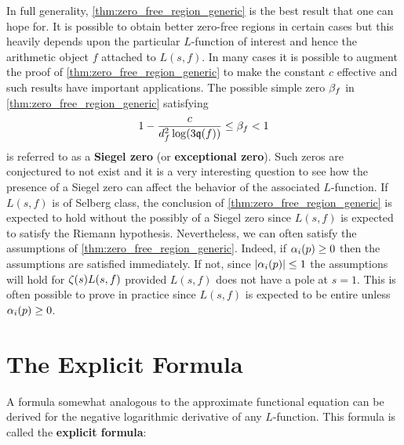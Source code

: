     In full generality, \cref{thm:zero_free_region_generic} is the best result that one can hope for. It is possible to obtain better zero-free regions in certain cases but this heavily depends upon the particular $L$-function of interest and hence the arithmetic object $f$ attached to $L(s,f)$. In many cases it is possible to augment the proof of \cref{thm:zero_free_region_generic} to make the constant $c$ effective and such results have important applications. The possible simple zero $\beta_{f}$ in \cref{thm:zero_free_region_generic} satisfying
    \[
      1-\frac{c}{d_{f}^{2}\log(3\mathfrak{q}(f))} \le \beta_{f} < 1
    \]
    is referred to as a \textbf{Siegel zero} (or \textbf{exceptional zero}). Such zeros are conjectured to not exist and it is a very interesting question to see how the presence of a Siegel zero can affect the behavior of the associated $L$-function. If $L(s,f)$ is of Selberg class, the conclusion of \cref{thm:zero_free_region_generic} is expected to hold without the possibly of a Siegel zero since $L(s,f)$ is expected to satisfy the Riemann hypothesis. Nevertheless, we can often satisfy the assumptions of \cref{thm:zero_free_region_generic}. Indeed, if $\alpha_{i}(p) \ge 0$ then the assumptions are satisfied immediately. If not, since $|\alpha_{i}(p)| \le 1$ the assumptions will hold for $\zeta(s)L(s,f)$ provided $L(s,f)$ does not have a pole at $s = 1$. This is often possible to prove in practice since $L(s,f)$ is expected to be entire unless $\alpha_{i}(p) \ge 0$.
  \section{The Explicit Formula}
    A formula somewhat analogous to the approximate functional equation can be derived for the negative logarithmic derivative of any $L$-function. This formula is called the \textbf{explicit formula}:

